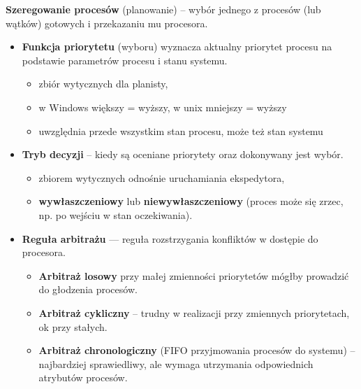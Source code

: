 \documentclass[main.tex]{subfiles}
\begin{document}
    \noindent \textbf{Szeregowanie procesów} (planowanie) -- wybór jednego z procesów (lub wątków) gotowych i
    przekazaniu mu procesora.
    \begin{itemize}[noitemsep]
        \item \textbf{Funkcja priorytetu} (wyboru) wyznacza aktualny priorytet procesu na podstawie parametrów procesu i stanu
        systemu.
        \begin{itemize}[noitemsep]
            \item zbiór wytycznych dla planisty,
            \item w Windows większy = wyższy, w unix mniejszy = wyższy
            \item uwzględnia przede wszystkim stan procesu, może też stan systemu
        \end{itemize}

        \item \textbf{Tryb decyzji} -- kiedy są oceniane priorytety oraz dokonywany jest wybór.
        \begin{itemize}[noitemsep]
            \item zbiorem wytycznych odnośnie uruchamiania ekspedytora,
            \item \textbf{wywłaszczeniowy} lub \textbf{niewywłaszczeniowy} (proces może się zrzec, np. po wejściu w stan oczekiwania).
        \end{itemize}

        \item \textbf{Reguła arbitrażu} — reguła rozstrzygania konfliktów w dostępie do procesora.
        \begin{itemize}[noitemsep]
            \item \textbf{Arbitraż losowy} przy małej zmienności priorytetów mógłby prowadzić do głodzenia procesów.
            \item \textbf{Arbitraż cykliczny} -- trudny w realizacji przy zmiennych priorytetach, ok przy stałych.
            \item \textbf{Arbitraż chronologiczny} (FIFO przyjmowania procesów do systemu) -- najbardziej sprawiedliwy, ale wymaga utrzymania odpowiednich
            atrybutów procesów.
        \end{itemize}
    \end{itemize}
\end{document}
